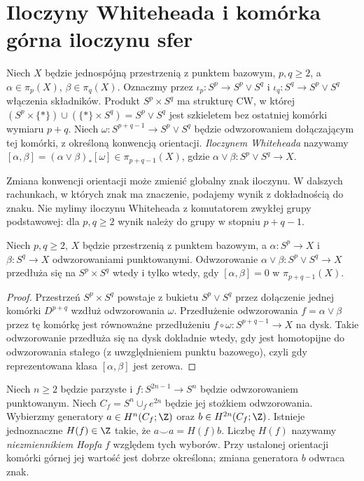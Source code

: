 \section{Iloczyny Whiteheada i komórka górna iloczynu sfer}
\begin{definicja}
Niech $X$ będzie jednospójną przestrzenią z punktem
bazowym, $p,q\ge2$, a
$\alpha\in\pi_p(X)$, $\beta\in\pi_q(X)$.
Oznaczmy przez $\iota_p:S^p\to S^p\vee S^q$ i
$\iota_q:S^q\to S^p\vee S^q$ włączenia składników.
Produkt $S^p\times S^q$ ma strukturę CW, w której
$(S^p\times\{*\})\cup(\{*\}\times S^q)=S^p\vee S^q$
jest szkieletem bez ostatniej komórki wymiaru $p+q$.
Niech $\omega:S^{p+q-1}\to S^p\vee S^q$
będzie odwzorowaniem dołączającym tej komórki, z określoną
konwencją orientacji. \emph{Iloczynem Whiteheada}
nazywamy
$[\alpha,\beta]=(\alpha\vee\beta)_*[\omega]
\in\pi_{p+q-1}(X)$, gdzie
$\alpha\vee\beta:S^p\vee S^q\to X$.
\end{definicja}

\begin{uwaga}
Zmiana konwencji orientacji może zmienić globalny znak
iloczynu. W dalszych rachunkach, w których znak ma
znaczenie, podajemy wynik z dokładnością do znaku.
Nie mylimy iloczynu Whiteheada z komutatorem
zwykłej grupy podstawowej: dla $p,q\ge2$ wynik
należy do grupy w stopniu $p+q-1$.
\end{uwaga}

\begin{twierdzenie}
\label{thm:whitehead-product-v7}
Niech $p,q\ge2$, $X$ będzie przestrzenią z punktem
bazowym, a $\alpha:S^p\to X$ i $\beta:S^q\to X$
odwzorowaniami punktowanymi. Odwzorowanie
$\alpha\vee\beta:S^p\vee S^q\to X$ przedłuża się
na $S^p\times S^q$ wtedy i tylko wtedy, gdy
$[\alpha,\beta]=0$ w $\pi_{p+q-1}(X)$.
\end{twierdzenie}
\begin{proof}
Przestrzeń $S^p\times S^q$ powstaje z bukietu
$S^p\vee S^q$ przez dołączenie jednej komórki
$D^{p+q}$ wzdłuż odwzorowania $\omega$.
Przedłużenie odwzorowania $f=\alpha\vee\beta$
przez tę komórkę jest równoważne przedłużeniu
$f\circ\omega:S^{p+q-1}\to X$ na dysk.
Takie odwzorowanie przedłuża się na dysk dokładnie wtedy,
gdy jest homotopijne do odwzorowania stałego (z uwzględnieniem
punktu bazowego), czyli gdy reprezentowana klasa
$[\alpha,\beta]$ jest zerowa.
\end{proof}

\begin{definicja}
Niech $n\ge2$ będzie parzyste i
$f:S^{2n-1}\to S^n$ będzie odwzorowaniem punktowanym.
Niech $C_f=S^n\cup_f e^{2n}$ będzie jej stożkiem
odwzorowania. Wybierzmy generatory
$a\in H^n(C_f;\Z)$ oraz $b\in H^{2n}(C_f;\Z)$.
Istnieje jednoznaczne $H(f)\in\Z$ takie, że
$a\smile a=H(f)b$. Liczbę $H(f)$ nazywamy
\emph{niezmiennikiem Hopfa} $f$ względem tych wyborów.
Przy ustalonej orientacji komórki górnej jej wartość
jest dobrze określona; zmiana generatora $b$ odwraca znak.
\end{definicja}


